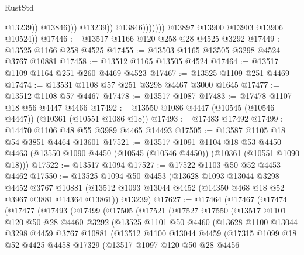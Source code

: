 \begin{lexlean}{RustStd}
\begin{coremodule}
                                    @13239))
                                @13846)))
                          @13239))
                      @13846)))))))
        @13897
        @13900
        @13903
        @13906
        @10524))
@17446 := @13517 @1166 @120 @258 @28 @4525 @3292
@17449 := @13525 @1166 @258 @4525
@17455 := @13503 @1165 @13505 @3298 @4524 @3767 @10881
@17458 := @13512 @1165 @13505 @4524
@17464 := @13517 @1109 @1164 @251 @260 @4469 @4523
@17467 := @13525 @1109 @251 @4469
@17474 := @13531 @1108 @57 @251 @3298 @4467 @3000 @1645
@17477 := @13512 @1108 @57 @4467
@17478 := @13517 @1087
@17483 := @17478 @1107 @18 @56 @4447 @4466
@17492 := @13550 @1086 @4447 (@10545 (@10546 @4447)) (@10361 (@10551 @1086 @18))
@17493 := @17483 @17492
@17499 := @14470 @1106 @48 @55 @3989 @4465 @14493
@17505 := @13587 @1105 @18 @54 @3851 @4464 @13601
@17521 := @13517
    @1091
    @1104
    @18
    @53
    @4450
    @4463
    (@13550 @1090 @4450 (@10545 (@10546 @4450)) (@10361 (@10551 @1090 @18)))
@17522 := @13517 @1094
@17527 := @17522 @1103 @50 @52 @4453 @4462
@17550 := @13525
    @1094
    @50
    @4453
    (@13628
      @1093
      @13044
      @3298
      @4452
      @3767
      @10881
      (@13512 @1093 @13044 @4452 (@14350 @468 @18 @52 @3967 @3881 @14364 @13861))
      @13239)
@17627 := @17464
    (@17467
      (@17474
        (@17477
          (@17493
            (@17499
              (@17505
                (@17521
                  (@17527
                    @17550
                    (@13517
                      @1101
                      @120
                      @50
                      @28
                      @4460
                      @3292
                      (@13525
                        @1101
                        @50
                        @4460
                        (@13628
                          @1100
                          @13044
                          @3298
                          @4459
                          @3767
                          @10881
                          (@13512
                            @1100
                            @13044
                            @4459
                            (@17315
                              @1099
                              @18
                              @52
                              @4425
                              @4458
                              @17329
                              (@13517
                                @1097
                                @120
                                @50
                                @28
                                @4456

\end{coremodule}
\end{lexlean}
